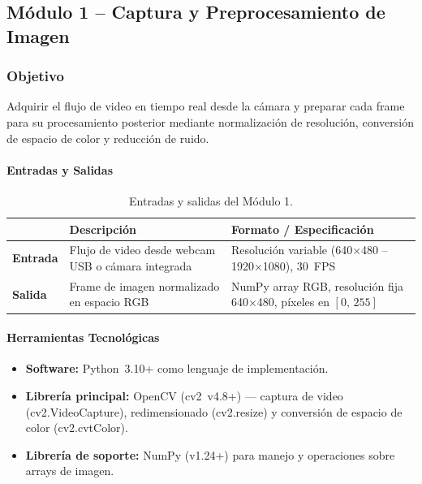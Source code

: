 \subsection{Módulo 1 -- Captura y Preprocesamiento de Imagen}

\subsubsection*{Objetivo}
Adquirir el flujo de video en tiempo real desde la cámara y preparar
cada frame para su procesamiento posterior mediante normalización de
resolución, conversión de espacio de color y reducción de ruido.

\paragraph{Entradas y Salidas}

\begin{table}[h!]
\centering
\label{tab:m1_io}
\renewcommand{\arraystretch}{1.3}
\begin{tabularx}{\textwidth}{
    >{\bfseries}p{3cm}
    X
    X
}    
\toprule
&
\textbf{Descripción} &
\textbf{Formato / Especificación} \\
\midrule
Entrada &
  Flujo de video desde webcam USB o cámara integrada &
  Resolución variable (640$\times$480 -- 1920$\times$1080), 30~FPS \\
\midrule
Salida &
  Frame de imagen normalizado en espacio RGB &
  NumPy array RGB, resolución fija 640$\times$480, píxeles en $[0,\,255]$ \\
\bottomrule
\end{tabularx}
\caption{Entradas y salidas del Módulo 1.}
\end{table}

\paragraph{Herramientas Tecnológicas}
\begin{itemize}[leftmargin=1.5em]
  \item \textbf{Software:} Python~3.10+ como lenguaje de implementación.
  \item \textbf{Librería principal:} OpenCV (cv2~v4.8+) \cite{Bradski2000}
        — captura de video (cv2.VideoCapture), redimensionado
        (cv2.resize) y conversión de espacio de color
        (cv2.cvtColor).
  \item \textbf{Librería de soporte:} NumPy (v1.24+) para manejo
        y operaciones sobre arrays de imagen.
\end{itemize}

